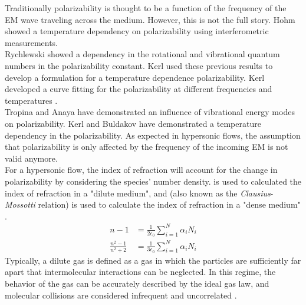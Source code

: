     Traditionally polarizability is thought to be a function of
    the frequency of the \gls{EM} wave traveling across the medium. However,
    this is not the full story. Hohm \cite{Hohm1986,Hohm1990} showed a
    temperature dependency on polarizability using interferometric
    measurements.\\

    Rychlewski \cite{Rychlewski1980} showed a dependency in the rotational and
    vibrational quantum numbers in the polarizability constant. Kerl
    \cite{Kerl1992} used these previous results to develop a formulation for a
    temperature dependence polarizability. Kerl developed a curve fitting for
    the polarizability at different frequencies and temperatures
    . \\

    Tropina \cite{Tropina2018, Tropina2020} and Anaya \cite{Anaya2023} have
    demonstrated an influence of vibrational energy modes on polarizability.
    Kerl \cite{Hohm1986} and Buldakov \cite{Buldakov2000,Buldakov2003a,
    Buldakov2003b} have demonstrated a temperature dependency in the
    polarizability. As expected in hypersonic flows, the assumption that
    polarizability is only affected by the frequency of the incoming
    \gls{EM} is not valid anymore.\\

    For a hypersonic flow, the index of refraction will account for the change
    in polarizability by considering the species' number density.
     is used to calculated the index of
    refraction in a "dilute medium", and 
    (also known as the \textit{Clausius}-\textit{Mossotti} relation) is used
    to calculate the index of refraction in a "dense medium" \cite{Feynman2011,
    Feynman2011a, Feynman2011b}. 
    \begin{subequations}\label{eq:refractiveIndex}
        \begin{align}
            n - 1 &= \frac{1}{2\epsilon_0}\sum_{i=1}^N\alpha_iN_i
            \label{eq:diluteRefractiveIndex} \\ 
            \frac{n^2 - 1}{n^2 + 2} &=
            \frac{1}{3\epsilon_0}\sum_{i=1}^N\alpha_iN_i
            \label{eq:denseRefractiveIndex}
        \end{align}
    \end{subequations}
    Typically, a dilute gas is defined as a gas in which the particles are
    sufficiently far apart that intermolecular interactions can be neglected.
    In this regime, the behavior of the gas can be accurately described by the
    ideal gas law, and molecular collisions are considered infrequent and
    uncorrelated \cite{Daily2018}. \\

